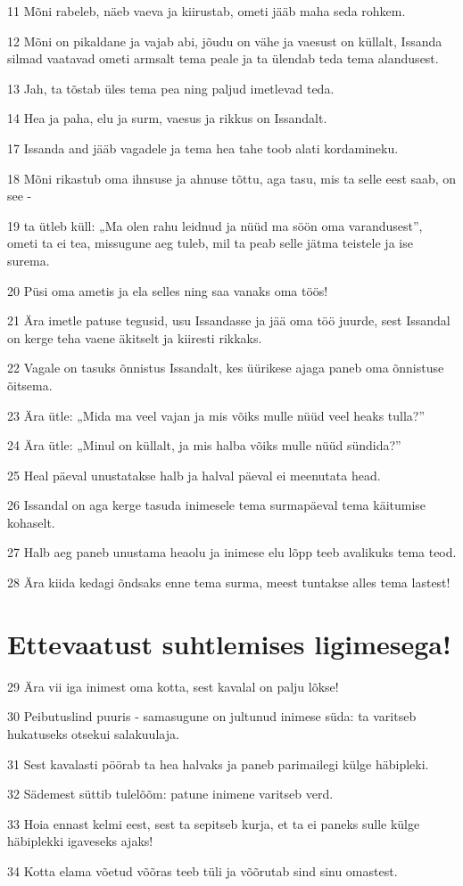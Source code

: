 \par 11 Mõni rabeleb, näeb vaeva ja kiirustab, ometi jääb maha seda rohkem.
\par 12 Mõni on pikaldane ja vajab abi, jõudu on vähe ja vaesust on küllalt, Issanda silmad vaatavad ometi armsalt tema peale ja ta ülendab teda tema alandusest.
\par 13 Jah, ta tõstab üles tema pea ning paljud imetlevad teda.
\par 14 Hea ja paha, elu ja surm, vaesus ja rikkus on Issandalt.
\par 17 Issanda and jääb vagadele ja tema hea tahe toob alati kordamineku.
\par 18 Mõni rikastub oma ihnsuse ja ahnuse tõttu, aga tasu, mis ta selle eest saab, on see -
\par 19 ta ütleb küll: „Ma olen rahu leidnud ja nüüd ma söön oma varandusest”, ometi ta ei tea, missugune aeg tuleb, mil ta peab selle jätma teistele ja ise surema.
\par 20 Püsi oma ametis ja ela selles ning saa vanaks oma töös!
\par 21 Ära imetle patuse tegusid, usu Issandasse ja jää oma töö juurde, sest Issandal on kerge teha vaene äkitselt ja kiiresti rikkaks.
\par 22 Vagale on tasuks õnnistus Issandalt, kes üürikese ajaga paneb oma õnnistuse õitsema.
\par 23 Ära ütle: „Mida ma veel vajan ja mis võiks mulle nüüd veel heaks tulla?”
\par 24 Ära ütle: „Minul on küllalt, ja mis halba võiks mulle nüüd sündida?”
\par 25 Heal päeval unustatakse halb ja halval päeval ei meenutata head.
\par 26 Issandal on aga kerge tasuda inimesele tema surmapäeval tema käitumise kohaselt.
\par 27 Halb aeg paneb unustama heaolu ja inimese elu lõpp teeb avalikuks tema teod.
\par 28 Ära kiida kedagi õndsaks enne tema surma, meest tuntakse alles tema lastest!

\section*{Ettevaatust suhtlemises ligimesega!}

\par 29 Ära vii iga inimest oma kotta, sest kavalal on palju lõkse!
\par 30 Peibutuslind puuris - samasugune on jultunud inimese süda: ta varitseb hukatuseks otsekui salakuulaja.
\par 31 Sest kavalasti pöörab ta hea halvaks ja paneb parimailegi külge häbipleki.
\par 32 Sädemest süttib tulelõõm: patune inimene varitseb verd.
\par 33 Hoia ennast kelmi eest, sest ta sepitseb kurja, et ta ei paneks sulle külge häbiplekki igaveseks ajaks!
\par 34 Kotta elama võetud võõras teeb tüli ja võõrutab sind sinu omastest.

